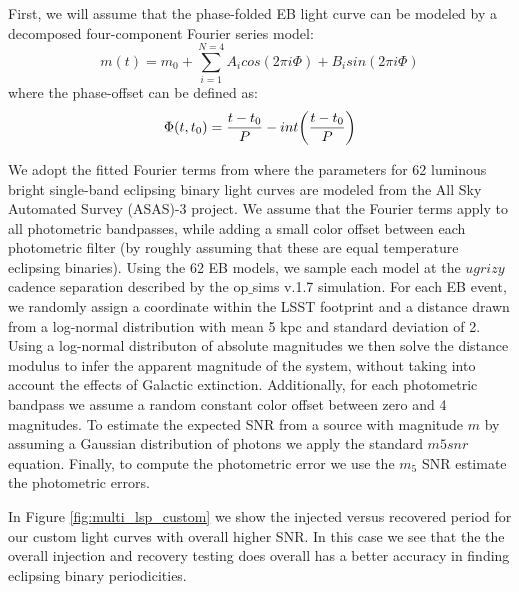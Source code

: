 \documentclass[DM,authoryear,toc]{lsstdoc}
\begin{document}
First, we will assume that the phase-folded EB light curve can be modeled by a decomposed four-component Fourier series model:
\begin{equation}
m(t) = m_0 + \sum_{i=1}^{N=4} A_icos(2\pi i\Phi) + B_isin(2\pi i \Phi)
\end{equation}
where the phase-offset can be defined as:
\begin{equation}
\Phi(t,t_{0}) = \frac{t-t_{0}}{P}-int\bigg{(}\frac{t-t_{0}}{P} \bigg{)}
\end{equation}

We adopt the fitted Fourier terms from \citet{Deb:Deb11} where the parameters for 62 luminous bright single-band eclipsing binary light curves are modeled from the All Sky Automated Survey
(ASAS)-3 project. We assume that the Fourier terms apply to all photometric bandpasses, while adding a small color offset between each photometric filter (by roughly assuming that these are equal temperature eclipsing binaries). Using the 62 EB models, we sample each model at the $ugrizy$ cadence separation described by the op$\_$sims v.1.7 simulation. For each EB event, we randomly assign a coordinate within the LSST footprint and a distance drawn from a log-normal distribution with mean 5 kpc and standard deviation of 2. Using a log-normal distributon of absolute magnitudes we then solve the distance modulus to infer the apparent magnitude of the system, without taking into account the effects of Galactic extinction. Additionally, for each photometric bandpass we assume a random constant color offset between zero and 4 magnitudes. To estimate the expected SNR from a source with magnitude $m$ by assuming a Gaussian distribution of photons we apply the standard $m5snr$ equation. Finally, to compute the photometric error we use the $m_5$ SNR estimate the photometric errors. 

In Figure \ref{fig:multi_lsp_custom} we show the injected versus recovered period for our custom light curves with overall higher SNR. In this case we see that the the overall injection and recovery testing does overall has a better accuracy in finding eclipsing binary periodicities.
\end{document}
